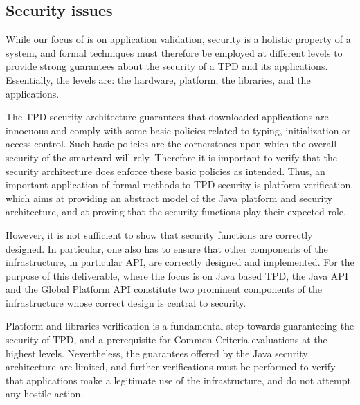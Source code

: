\subsection{Security issues}
While our focus of is on application validation,
security is a holistic property of a system, and formal techniques
must therefore be employed at different levels to provide strong
guarantees about the security of a TPD and its applications.
Essentially, the levels are: the hardware, platform, the libraries,
and the applications.

The TPD security architecture guarantees that
downloaded applications are innocuous and comply with some basic
policies related to typing, initialization or access control. Such
basic policies are the cornerstones upon which the overall security of
the smartcard will rely. Therefore it is important to verify that the
security architecture does enforce these basic policies as
intended. Thus, an important application of formal methods to TPD
security is platform verification, which aims at providing an abstract
model of the Java platform and security architecture, and at proving
that the security functions play their expected role.

However, it is not sufficient to show that
security functions are correctly designed. In particular, one also has
to ensure that other components of the infrastructure, in particular
API, are correctly designed and implemented. For the purpose of this
deliverable, where the focus is on Java based TPD, the Java API and
the Global Platform API constitute two prominent components of the
infrastructure whose correct design is central to security. 

Platform and libraries verification is a fundamental step towards
guaranteeing the security of TPD, and a prerequisite for Common
Criteria evaluations at the highest levels. Nevertheless, the
guarantees offered by the Java security architecture are limited, and
further verifications must be performed to verify that applications
make a legitimate use of the infrastructure, and do not attempt any
hostile action.

